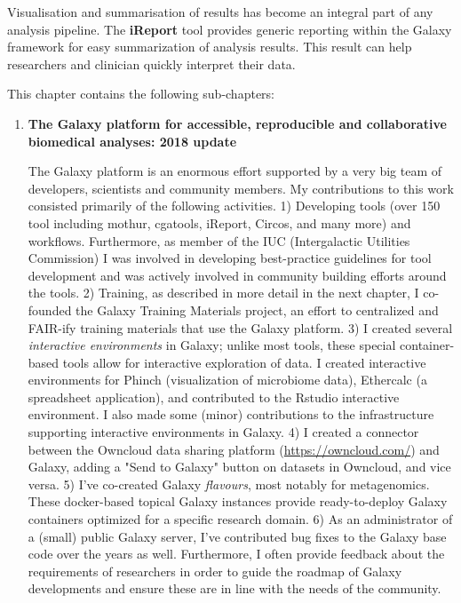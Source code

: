 Visualisation and summarisation of results has become an integral part of any analysis pipeline. The \textbf{iReport} tool provides generic reporting within the Galaxy framework for easy summarization of analysis results. This result can help researchers and clinician quickly interpret their data.


This chapter contains the following sub-chapters:

\begin{enumerate}[label=\ref{chapter:general}.\arabic*]
\itemsep-0.5em
\setcounter{enumi}{-1}
\item \textbf{The Galaxy platform for accessible, reproducible and collaborative biomedical analyses: 2018 update}

The Galaxy platform is an enormous effort supported by a very big team of developers, scientists and community members. My contributions to this work consisted primarily of the following activities. 1) Developing tools (over 150 tool including mothur, cgatools, iReport, Circos, and many more) and workflows. Furthermore, as member of the IUC (Intergalactic Utilities Commission) I was involved in developing best-practice guidelines for tool development and was actively involved in community building efforts around the tools. 2) Training, as described in more detail in the next chapter, I co-founded the Galaxy Training Materials project, an effort to centralized and FAIR-ify training materials that use the Galaxy platform. 3) I created several \emph{interactive environments} in Galaxy; unlike most tools, these special container-based tools allow for interactive exploration of data. I created interactive environments for Phinch (visualization of microbiome data), Ethercalc (a spreadsheet application), and contributed to the Rstudio interactive environment. I also made some (minor) contributions to the infrastructure supporting interactive environments in Galaxy. 4) I created a connector between the Owncloud data sharing platform (\url{https://owncloud.com/}) and Galaxy, adding a "Send to Galaxy" button on datasets in Owncloud, and vice versa. 5) I've co-created Galaxy \emph{flavours}, most notably for metagenomics. These docker-based topical Galaxy instances provide ready-to-deploy Galaxy containers optimized for a specific research domain. 6) As an administrator of a (small) public Galaxy server, I've contributed bug fixes to the Galaxy base code over the years as well. Furthermore, I often provide feedback about the requirements of researchers in order to guide the roadmap of Galaxy developments and ensure these are in line with the needs of the community.



\end{enumerate}
